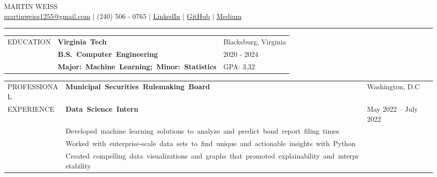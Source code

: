 \documentclass[12pt, letter]{book}
\begin{document}
\begin{center}
    {\Huge MARTIN WEISS} \\
    \href{mailto:martinweiss1255@gmail.com}{{martinweiss1255@gmail.com}} $|$ 
    (240) 506 - 0765 $|$ 
    \href{https://www.linkedin.com/in/martinweiss12}{LinkedIn} $|$
    \href{https://github.com/MartinWeiss12}{GitHub} $|$
    \href{https://medium.com/@martinweiss1255}{Medium}\\[-2mm]
    \rule{\textwidth}{0.4pt}
\end{center}


\noindent
\begin{tabular}{@{}>{\raggedright\arraybackslash}p{3.5cm}@{}p{5cm}@{}>{\raggedleft\arraybackslash}p{10.5cm}@{}}
    \footnotesize {EDUCATION} & \textbf{\footnotesize\mbox{Virginia Tech}} & {\footnotesize {Blacksburg, Virginia}} \\
    & \textbf{\footnotesize\mbox{B.S. Computer Engineering}} & {\footnotesize {2020 - 2024}} \\
    & \textbf{\footnotesize\mbox{Major: Machine Learning; Minor: Statistics}} & {\footnotesize {GPA: 3.32}} \\
\end{tabular}

\vspace{10mm}


\noindent
\begin{tabular}{@{}>{\raggedright\arraybackslash}p{3.5cm}@{}p{5cm}@{}>{\raggedleft\arraybackslash}p{10.5cm}@{}}
    \footnotesize {PROFESSIONAL} & \textbf{\footnotesize\mbox{Municipal Securities Rulemaking Board}} & \footnotesize {Washington, D.C} \\
    \footnotesize {EXPERIENCE} & \textbf{\footnotesize\mbox{Data Science Intern}} & {\footnotesize {May 2022 – July 2022}} \\
    & {\footnotesize\mbox{Developed machine learning solutions to analyze and predict bond report filing times}} \\
    & {\footnotesize\mbox{Worked with enterprise-scale data sets to find unique and actionable insights with Python}} \\
    & {\footnotesize\mbox{Created compelling data visualizations and graphs that promoted explainability and interpretability}}
\end{tabular}

\vspace{4mm}
\end{document}
